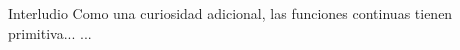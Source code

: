 \documentclass{book}
\begin{document}
\begin{cajaInterludio}{Interludio}
Como una curiosidad adicional, las funciones continuas tienen primitiva...
...
\end{cajaInterludio}
\end{document}
